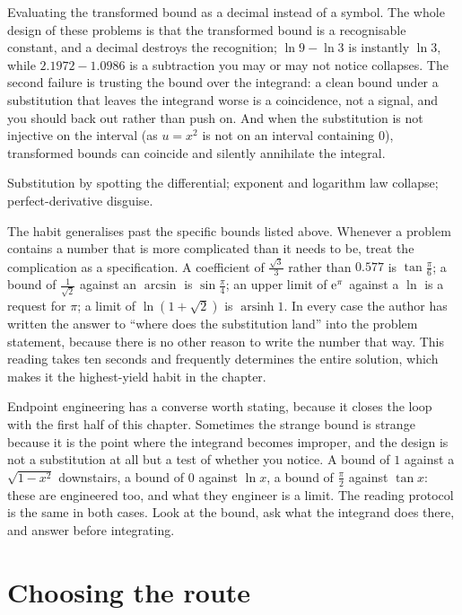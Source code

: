 \begin{trap}
Evaluating the transformed bound as a decimal instead of a symbol. The whole design of these problems is that the transformed bound is a recognisable constant, and a decimal destroys the recognition; $\ln9-\ln3$ is instantly $\ln3$, while $2.1972-1.0986$ is a subtraction you may or may not notice collapses. The second failure is trusting the bound over the integrand: a clean bound under a substitution that leaves the integrand worse is a coincidence, not a signal, and you should back out rather than push on. And when the substitution is not injective on the interval (as $u=x^{2}$ is not on an interval containing $0$), transformed bounds can coincide and silently annihilate the integral.
\end{trap}

\begin{seealsob}Substitution by spotting the differential; exponent and logarithm law collapse; perfect-derivative disguise.\end{seealsob}

The habit generalises past the specific bounds listed above. Whenever a problem contains a number that is more complicated than it needs to be, treat the complication as a specification. A coefficient of $\tfrac{\sqrt3}{3}$ rather than $0.577$ is $\tan\tfrac{\pi}{6}$; a bound of $\tfrac{1}{\sqrt2}$ against an $\arcsin$ is $\sin\tfrac{\pi}{4}$; an upper limit of $\mathrm{e}^{\pi}$ against a $\ln$ is a request for $\pi$; a limit of $\ln(1+\sqrt2)$ is $\operatorname{arsinh}1$. In every case the author has written the answer to ``where does the substitution land'' into the problem statement, because there is no other reason to write the number that way. This reading takes ten seconds and frequently determines the entire solution, which makes it the highest-yield habit in the chapter.

Endpoint engineering has a converse worth stating, because it closes the loop with the first half of this chapter. Sometimes the strange bound is strange because it is the point where the integrand becomes improper, and the design is not a substitution at all but a test of whether you notice. A bound of $1$ against a $\sqrt{1-x^{2}}$ downstairs, a bound of $0$ against $\ln x$, a bound of $\tfrac{\pi}{2}$ against $\tan x$: these are engineered too, and what they engineer is a limit. The reading protocol is the same in both cases. Look at the bound, ask what the integrand does there, and answer before integrating.

\section{Choosing the route}

